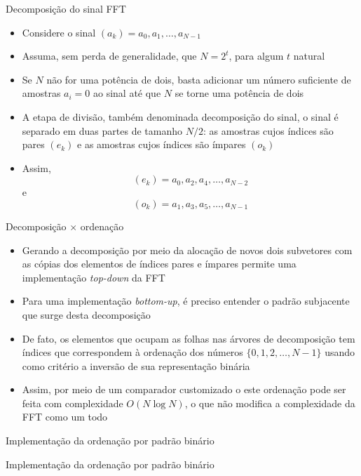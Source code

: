 \begin{frame}[fragile]{Decomposição do sinal FFT}

    \begin{itemize}
        \item Considere o sinal $(a_k) = a_0, a_1, \ldots, a_{N-1}$

        \item Assuma, sem perda de generalidade, que $N = 2^t$, para algum $t$ natural

        \item Se $N$ não for uma potência de dois, basta adicionar um número suficiente de amostras
            $a_i = 0$ ao sinal até que $N$ se torne uma potência de dois

        \item A etapa de divisão, também denominada decomposição do sinal, o sinal é separado
            em duas partes de tamanho $N/2$: as amostras cujos índices são pares $(e_k)$ e as 
            amostras cujos índices são ímpares $(o_k)$

        \item Assim,
        \[
            (e_k) = a_0, a_2, a_4, \ldots, a_{N - 2}
        \]
        e
        \[
            (o_k) = a_1, a_3, a_5, \ldots, a_{N - 1}
        \]
    \end{itemize}

\end{frame}



\begin{frame}[fragile]{Decomposição $\times$ ordenação}

    \begin{itemize}
        \item Gerando a decomposição por meio da alocação de novos dois subvetores com as cópias
            dos elementos de índices pares e ímpares permite uma implementação \textit{top-down}
            da FFT

        \item Para uma implementação \textit{bottom-up}, é preciso entender
            o padrão subjacente que surge desta decomposição

        \item De fato, os elementos que ocupam as folhas nas árvores de decomposição tem índices
            que correspondem à ordenação dos números $\{ 0, 1, 2, \ldots, N - 1\}$ usando como
            critério a inversão de sua representação binária

        \item Assim, por meio de um comparador customizado o este ordenação pode ser feita 
            com complexidade $O(N\log N)$, o que não modifica a complexidade da FFT como um todo
    \end{itemize}

\end{frame}



\begin{frame}[fragile]{Implementação da ordenação por padrão binário}
\end{frame}

\begin{frame}[fragile]{Implementação da ordenação por padrão binário}
\end{frame}
